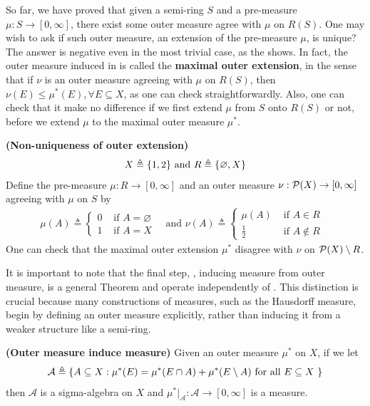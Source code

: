 \documentclass{report}
\begin{document}
\begin{mdframed}
  So far, we have proved that given a semi-ring $S$ and a pre-measure $\mu:S\rightarrow [0,\infty]$, there exist some outer measure agree with $\mu$ on $R(S)$. One may wish to ask if such outer measure, an extension of the pre-measure $\mu$, is unique? The answer is negative even in the most trivial case, as the  shows. In fact, the outer measure induced in  is called the \textbf{maximal outer extension}, in the sense that if $\nu$ is an outer measure agreeing with  $\mu$ on $R(S)$, then  $\nu(E)\leq \mu^*(E),\forall E\subseteq X$, as one can check straightforwardly. Also, one can check that it make no difference if we first extend $\mu$ from $S$ onto  $R(S)$ or not, before we extend $\mu$ to the maximal outer measure $\mu^*$. 
\end{mdframed}
\begin{Example}{\textbf{(Non-uniqueness of outer extension)}}{}
\label{Nou}
\begin{align*}
X\triangleq \{ 1,2 \}\text{ and }R\triangleq \{ \varnothing,X \}
\end{align*}
Define the pre-measure $\mu:R\rightarrow [0,\infty]$ and an outer measure $\nu:\mathcal{P}(X)\rightarrow [0,\infty]$ agreeing with $\mu$ on $S$ by 
\begin{align*}
\mu (A)\triangleq \begin{cases}
  0& \text{ if $A=\varnothing$ }\\
  1& \text{ if $A=X$ }
\end{cases}\text{ and }\nu(A)\triangleq \begin{cases}
  \mu (A)& \text{ if $A\in R$ }\\
  \frac{1}{2}& \text{ if $A\not\in R$ }
\end{cases}
\end{align*}
One can check that the maximal outer extension $\mu^*$ disagree with $\nu$ on $\mathcal{P}(X)\setminus R$.
\end{Example}
\begin{mdframed}
It is important to note that the final step, , inducing measure from outer measure, is a general Theorem and operate independently of . This distinction is crucial because many constructions of measures, such as the Hausdorff measure, begin by defining an outer measure explicitly, rather than inducing it from a weaker structure like a semi-ring.
\end{mdframed}
\begin{theorem}
\label{Omi}
\textbf{(Outer measure induce measure)} Given an outer measure $\mu^*$ on $X$, if we let 
\begin{align*}
  \mathcal{A}\triangleq \{ A \subseteq X:\mu^*(E)=\mu^*(E\cap A)+ \mu^*(E\setminus A)\text{ for all $E\subseteq X$ } \} 
\end{align*}
then $\mathcal{A}$ is a sigma-algebra on $X$ and  $\mu^*|_{\mathcal{A}}:\mathcal{A}\rightarrow [0,\infty]$ is a measure. 
\end{theorem}
\end{document}
